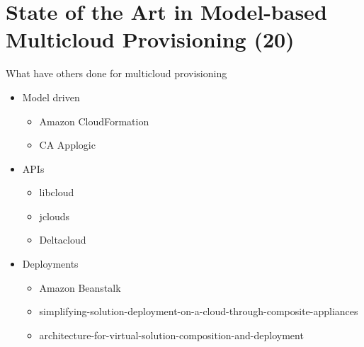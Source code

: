 \section{State of the Art in Model-based Multicloud Provisioning (20)}

What have others done for multicloud provisioning

\begin{itemize}
  \item Model driven
    \begin{itemize}
      \item Amazon CloudFormation
      \item CA Applogic
    \end{itemize}
  \item APIs
    \begin{itemize}
      \item libcloud
      \item jclouds
      \item Deltacloud
    \end{itemize}
  \item Deployments
    \begin{itemize}
      \item Amazon Beanstalk
      \item simplifying-solution-deployment-on-a-cloud-through-composite-appliances
      \item architecture-for-virtual-solution-composition-and-deployment
    \end{itemize}
\end{itemize}
